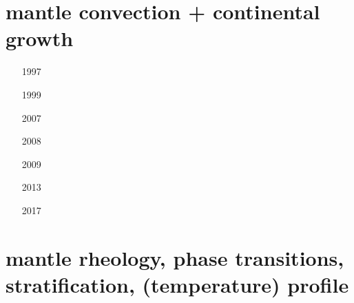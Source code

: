 \section{mantle convection + continental growth}

\begin{small}
\begin{itemize}
\item[1997]
\item[1999]
\item[2007]
\item[2008]
 \\
\item[2009]
 \\
\item[2013]
 \\
\item[2017]
\end{itemize}
\end{small}

\section{mantle rheology, phase transitions, stratification, (temperature) profile}


